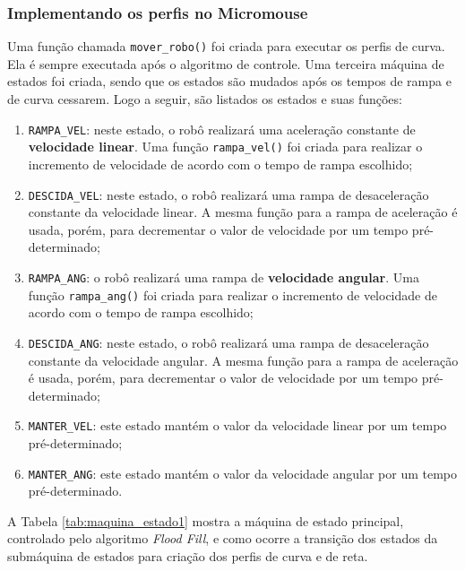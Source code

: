 \subsubsection{Implementando os perfis no Micromouse}
Uma função chamada \verb+mover_robo()+ foi criada para executar os perfis de curva. Ela é sempre executada após o algoritmo de controle. Uma terceira máquina de estados foi criada, sendo que os estados são mudados após os tempos de rampa e de curva cessarem. Logo a seguir, são listados os estados e suas funções:
\begin{enumerate}[leftmargin=2cm,label=\alph*)]
\item \verb+RAMPA_VEL+: neste estado, o robô realizará uma aceleração constante de \textbf{velocidade linear}. Uma função \verb+rampa_vel()+ foi criada para realizar o incremento de velocidade de acordo com o tempo de rampa escolhido;
\item \verb+DESCIDA_VEL+: neste estado, o robô realizará uma rampa de desaceleração constante da velocidade linear. A mesma função para a rampa de aceleração é usada, porém, para decrementar o valor de velocidade por um tempo pré-determinado;
\item \verb+RAMPA_ANG+: o robô realizará uma rampa de \textbf{velocidade angular}. Uma função \verb+rampa_ang()+ foi criada para realizar o incremento de velocidade de acordo com o tempo de rampa escolhido;
\item \verb+DESCIDA_ANG+: neste estado, o robô realizará uma rampa de desaceleração constante da velocidade angular. A mesma função para a rampa de aceleração é usada, porém, para decrementar o valor de velocidade por um tempo pré-determinado;
\item \verb+MANTER_VEL+: este estado mantém o valor da velocidade linear por um tempo pré-determinado;
\item \verb+MANTER_ANG+: este estado mantém o valor da velocidade angular por um tempo pré-determinado.
\end{enumerate}

A Tabela \ref{tab:maquina_estado1} mostra a máquina de estado principal, controlado pelo algoritmo \emph{Flood Fill}, e como ocorre a transição dos estados da submáquina de estados para criação dos perfis de curva e de reta.

